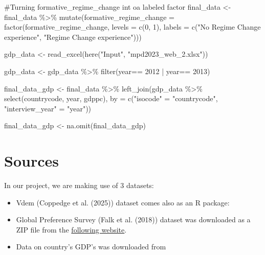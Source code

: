 \documentclass[
  letterpaper,
  DIV=11,
  numbers=noendperiod]{scrartcl}
\newenvironment{Shaded}{\begin{snugshade}}{\end{snugshade}}
\newcommand{\AttributeTok}[1]{\textcolor[rgb]{0.40,0.45,0.13}{#1}}
\newcommand{\CommentTok}[1]{\textcolor[rgb]{0.37,0.37,0.37}{#1}}
\newcommand{\DecValTok}[1]{\textcolor[rgb]{0.68,0.00,0.00}{#1}}
\newcommand{\FunctionTok}[1]{\textcolor[rgb]{0.28,0.35,0.67}{#1}}
\newcommand{\NormalTok}[1]{\textcolor[rgb]{0.00,0.23,0.31}{#1}}
\newcommand{\OtherTok}[1]{\textcolor[rgb]{0.00,0.23,0.31}{#1}}
\newcommand{\SpecialCharTok}[1]{\textcolor[rgb]{0.37,0.37,0.37}{#1}}
\newcommand{\StringTok}[1]{\textcolor[rgb]{0.13,0.47,0.30}{#1}}
\begin{document}
\begin{Shaded}
\begin{Highlighting}[]
\CommentTok{\#Turning formative\_regime\_change int oa labeled factor}
\NormalTok{final\_data }\OtherTok{\textless{}{-}}\NormalTok{ final\_data }\SpecialCharTok{\%\textgreater{}\%}
  \FunctionTok{mutate}\NormalTok{(}\AttributeTok{formative\_regime\_change =} \FunctionTok{factor}\NormalTok{(formative\_regime\_change, }
                                          \AttributeTok{levels =} \FunctionTok{c}\NormalTok{(}\DecValTok{0}\NormalTok{, }\DecValTok{1}\NormalTok{),}
                                          \AttributeTok{labels =} \FunctionTok{c}\NormalTok{(}\StringTok{"No Regime Change experience"}\NormalTok{, }\StringTok{"Regime Change experience"}\NormalTok{)))}


\NormalTok{gdp\_data }\OtherTok{\textless{}{-}} \FunctionTok{read\_excel}\NormalTok{(}\FunctionTok{here}\NormalTok{(}\StringTok{"Input"}\NormalTok{, }\StringTok{"mpd2023\_web\_2.xlsx"}\NormalTok{))}

\NormalTok{gdp\_data }\OtherTok{\textless{}{-}}\NormalTok{ gdp\_data }\SpecialCharTok{\%\textgreater{}\%} 
  \FunctionTok{filter}\NormalTok{(year}\SpecialCharTok{==} \DecValTok{2012} \SpecialCharTok{|}\NormalTok{ year}\SpecialCharTok{==} \DecValTok{2013}\NormalTok{)}


\NormalTok{final\_data\_gdp }\OtherTok{\textless{}{-}}\NormalTok{ final\_data }\SpecialCharTok{\%\textgreater{}\%}
  \FunctionTok{left\_join}\NormalTok{(gdp\_data }\SpecialCharTok{\%\textgreater{}\%} \FunctionTok{select}\NormalTok{(countrycode, year, gdppc),}
            \AttributeTok{by =} \FunctionTok{c}\NormalTok{(}\StringTok{"isocode"} \OtherTok{=} \StringTok{"countrycode"}\NormalTok{, }\StringTok{"interview\_year"} \OtherTok{=} \StringTok{"year"}\NormalTok{))}

\NormalTok{final\_data\_gdp }\OtherTok{\textless{}{-}} \FunctionTok{na.omit}\NormalTok{(final\_data\_gdp)}
\end{Highlighting}
\end{Shaded}

\hypertarget{sources}{%
\section{Sources}\label{sources}}

In our project, we are making use of 3 datasets:

\begin{itemize}
\item
  Vdem (Coppedge et al. (2025)) dataset comes also as an R package:
\item
  Global Preference Survey (Falk et al. (2018)) dataset was downloaded
  as a ZIP file from the \href{https://gps.iza.org/downloads}{following
  website}.
\item
  Data on country's GDP's was downloaded from
\end{itemize}
\end{document}
